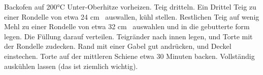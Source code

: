 Backofen auf 200°C Unter-Oberhitze vorheizen.
Teig dritteln.
Ein Drittel Teig zu einer Rondelle von etwa 24 cm \diameter \ auswallen, kühl stellen. 
Restlichen Teig auf wenig Mehl zu einer Rondelle von etwa 32 cm \diameter \ auswahlen und in die gebutterte form legen.
Die Füllung darauf verteilen. 
Teigränder nach innen legen, und Torte mit der Rondelle zudecken. 
Rand mit einer Gabel gut andrücken, und Deckel einstechen.
Torte auf der mittleren Schiene etwa 30 Minuten backen.
Vollständig auskühlen lassen (das ist ziemlich wichtig). 

\vspace*{0.75 cm}

\begin{recipeblock}
	\noindent 
\end{recipeblock}